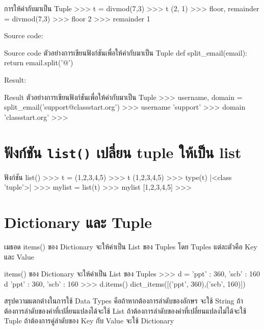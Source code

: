 \begin{codelist}{การให้ค่ากับมาเป็น Tuple}{}
>>> t = divmod(7,3)
>>> t
(2, 1)
>>> floor, remainder = divmod(7,3)
>>> floor
2
>>> remainder
1
\end{codelist}

Source code:
\begin{codelist}{Source code ตัวอย่างการเขียนฟังก์ชันเพื่อให้ค่ากับมาเป็น Tuple}{}
def split_email(email):
    return email.split('@')
\end{codelist}

Result:
\begin{codelist}{Result ตัวอย่างการเขียนฟังก์ชันเพื่อให้ค่ากับมาเป็น Tuple}{}
>>> username, domain = split_email('support@classstart.org')
>>> username
'support'
>>> domain
'classstart.org'
>>>
\end{codelist}

\section{ฟังก์ชัน \texttt{list()} เปลี่ยน tuple ให้เป็น list}

\begin{codelist}{ฟังก์ชัน list()}{}
>>> t = (1,2,3,4,5)
>>> t
(1,2,3,4,5)
>>> type(t)
|<class \rq{}tuple\rq{}>|
>>> mylist = list(t)
>>> mylist
[1,2,3,4,5]
>>>
\end{codelist}


\section{Dictionary และ Tuple}

เมธอด items() ของ Dictionary จะให้ค่าเป็น List  ของ Tuples โดย Tuples แต่ละตัวคือ Key และ Value 

\begin{codelist}{items() ของ Dictionary จะให้ค่าเป็น List ของ Tuples}{}
>>> d = {'ppt' : 360, 'scb' : 160}
d
{'ppt' : 360, 'scb' : 160}
>>> d.items()
dict_items([('ppt', 360),('scb', 160)])
\end{codelist}


สรุปความแตกต่างในการใช้ Data Types คือถ้าหากต้องการลำดับของอักษร จะใช้ String ถ้าต้องการลำดับของค่าที่เปลี่ยนแปลงได้จะใช้ List ถ้าต้องการลำดับของค่าที่เปลี่ยนแปลงไม่ได้จะใช้ Tuple ถ้าต้องการคู่ลำดับของ Key กับ Value จะใช้ Dictionary

